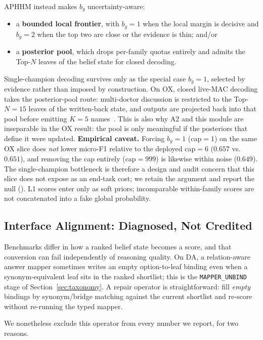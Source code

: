 APHHM instead makes $b_g$ uncertainty-aware:
\begin{itemize}
  \item a \textbf{bounded local frontier}, with $b_g = 1$ when the local margin is decisive and $b_g = 2$ when the top two are close or the evidence is thin; and/or
  \item a \textbf{posterior pool}, which drops per-family quotas entirely and admits the Top-$N$ leaves of the belief state for closed decoding.
\end{itemize}
Single-champion decoding survives only as the special case $b_g = 1$, selected by evidence rather than imposed by construction.
On OX, closed live-MAC decoding takes the posterior-pool route: multi-doctor discussion is restricted to the Top-$N{=}15$ leaves of the written-back state, and outputs are projected back into that pool before emitting $K{=}5$ names~\cite{chen2025mac,mac2026}.
This is also why A2 and this module are inseparable in the OX result: the pool is only meaningful if the posteriors that define it were updated.
\textbf{Empirical caveat.}
Forcing $b_g{=}1$ (cap${=}1$) on the same OX slice does \emph{not} lower micro-F1 relative to the deployed cap${=}6$ ($0.657$ vs.\ $0.651$), and removing the cap entirely (cap${=}999$) is likewise within noise ($0.649$).
The single-champion bottleneck is therefore a design and audit concern that this slice does not expose as an end-task cost; we retain the argument and report the null ().
L1 scores enter only as soft priors; incomparable within-family scores are not concatenated into a fake global probability.

\subsection{Interface Alignment: Diagnosed, Not Credited}
\label{sec:protocol}

Benchmarks differ in how a ranked belief state becomes a score, and that conversion can fail independently of reasoning quality.
On DA, a relation-aware answer mapper sometimes writes an empty option-to-leaf binding even when a synonym-equivalent leaf sits in the ranked shortlist; this is the \texttt{MAPPER\_UNBIND} stage of Section~\ref{sec:taxonomy}.
A repair operator is straightforward: fill \emph{empty} bindings by synonym/bridge matching against the current shortlist and re-score without re-running the typed mapper.

We nonetheless exclude this operator from every number we report, for two reasons.


